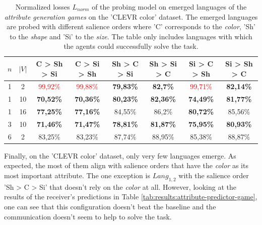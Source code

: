 \begin{table}[ht]
    \centering
    \begin{tabular}{cc|c|c|c|c|c|c}
        \toprule
        $n$ & $|V|$ & \textbf{C > Sh > Si}     & \textbf{C > Si > Sh}     & \textbf{Sh > C > Si} & \textbf{Sh > Si > C} & \textbf{Si > C > Sh}     & \textbf{Si > Sh > C} \\\midrule
        {1} & {2}   & \textcolor{red}{99,92\%} & \textcolor{red}{99,88\%} & \textbf{79,83\%}     & \textbf{82,7\%}      & \textcolor{red}{99,71\%} & \textbf{82,14\%}     \\
        {1} & {10}  & \textbf{70,52\%}         & \textbf{70,36\%}         & \textbf{80,23\%}     & \textbf{82,36\%}     & \textbf{74,49\%}         & \textbf{81,77\%}     \\
        {1} & {16}  & \textbf{77,25\%}         & \textbf{77,16\%}         & {84,55\%}            & {86,2\%}             & \textbf{80,72\%}         & {85,56\%}            \\
        {3} & {10}  & \textbf{71,46\%}         & \textbf{71,47\%}         & \textbf{78,81\%}     & \textbf{81,87\%}     & \textbf{75,95\%}         & \textbf{80,93\%}     \\
        {6} & {2}   & {83,25\%}                & {83,23\%}                & {87,74\%}            & {88,95\%}            & {85,38\%}                & {88,87\%}            \\
        \bottomrule
    \end{tabular}
    \caption{Normalized losses $L_{norm}$ of the probing model on emerged languages of the \emph{attribute generation games} on the 'CLEVR color' dataset. The emerged languages are probed with different salience orders where 'C' corresponds to the \emph{color}, 'Sh' to the \emph{shape} and 'Si' to the \emph{size}. The table only includes languages with which the agents could successfully solve the task.}
    \label{tab:probing:attribute-generator:colour}
\end{table}

Finally, on the 'CLEVR color' dataset, only very few languages emerge.
As expected, the most of them align with salience orders that have the \emph{color} as its most important attribute.
The one exception is $Lang_{1,2}$ with the salience order 'Sh > C > Si' that doesn't rely on the \emph{color} at all.
However, looking at the results of the receiver's predictions in Table \ref{tab:results:attribute-predictor-game}, one can see that this configuration doesn't beat the baseline and the communication doesn't seem to help to solve the task.

